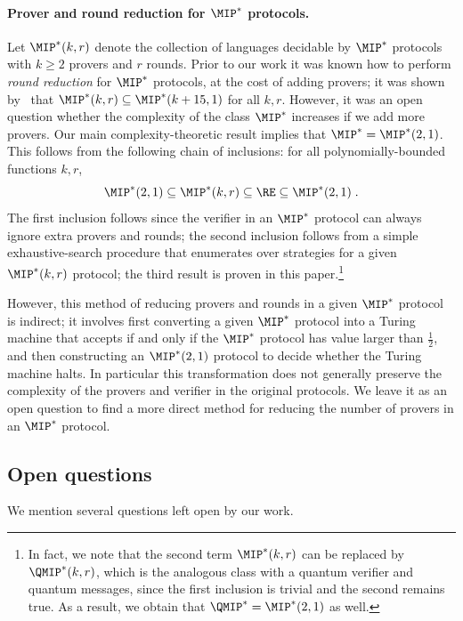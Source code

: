 \paragraph{Prover and round reduction for $\MIP^*$ protocols.} Let $\MIP^*(k,r)$ denote the collection of languages decidable by $\MIP^*$ protocols with $k\geq 2$ provers and $r$ rounds. Prior to our work it was known how to perform \emph{round reduction} for $\MIP^*$ protocols, at the cost of adding provers; it was shown by~\cite{ji2017compression,fitzsimons2018quantum} that $\MIP^*(k,r) \subseteq \MIP^*(k + 15,1)$ for all $k, r$. However, it was an open question whether the complexity of the class $\MIP^*$ increases if we add more provers.
Our main complexity-theoretic result implies that $\MIP^* = \MIP^*(2,1)$. This follows from the following chain of inclusions: for all polynomially-bounded functions $k,r$,
 \[
 	\MIP^*(2,1) \subseteq \MIP^*(k,r) \subseteq \RE \subseteq \MIP^*(2,1)\;.
\]
The first inclusion follows since the verifier in an $\MIP^*$ protocol can always ignore extra provers and rounds; the second inclusion follows from a simple exhaustive-search procedure that enumerates over strategies for a given $\MIP^*(k,r)$ protocol; the third result is proven in this paper.\footnote{In fact, we note that the second term $\MIP^*(k,r)$ can be replaced by $\QMIP^*(k,r)$, which is the analogous class with a quantum verifier and quantum messages, since the first inclusion is trivial and the second remains true. As a result, we obtain that $\QMIP^* = \MIP^*(2,1)$ as well.}

However, this method of reducing provers and rounds in a given $\MIP^*$ protocol is indirect; it involves first converting a given $\MIP^*$ protocol into a Turing machine that accepts if and only if the $\MIP^*$ protocol has value larger than $\frac{1}{2}$, and then constructing an $\MIP^*(2,1)$ protocol to decide whether the Turing machine halts. In particular this transformation does not generally preserve the complexity of the provers and verifier in the original protocols. We leave it as an open question to find a more direct method for reducing the number of provers in an $\MIP^*$ protocol.



\subsection{Open questions}
\label{sec:open}

We mention several questions left open by our work.

